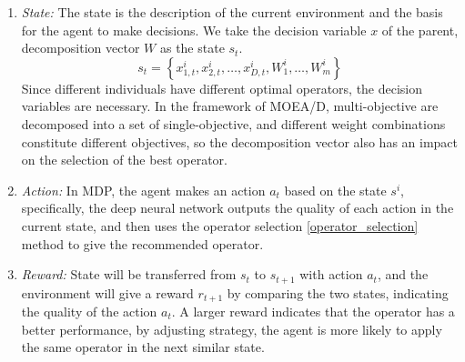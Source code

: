 \documentclass[journal]{IEEEtran}
\newcommand{\TODO}[1]{\textcolor[rgb]{1.00,0.40,0.22}{#1}}
\begin{document}
\begin{enumerate}
  \item \textit{State:}
        The state is the description of the current environment and the basis for the agent to make decisions. We take the decision variable $x$ of the parent, decomposition vector $W$ as the state $s_t$.
        \begin{equation}
          s_{t}=\left\{x_{1,t}^i, x_{2,t}^i, \ldots, x_{D,t}^i, W_{1}^{i}, \ldots, W_{m}^{i}\right\}
        \end{equation}
        Since different individuals have different optimal operators, the decision variables are necessary. In the framework of MOEA/D, multi-objective are decomposed into a set of single-objective, and different weight combinations constitute different objectives, so the decomposition vector also has an impact on the selection of the best operator.
  \item \textit{Action:}
        In MDP, the agent makes an action $a_t$ based on the state $s^i$, specifically, the deep neural network outputs the quality of each action in the current state, and then uses the operator selection \ref{operator_selection} method to give the recommended operator.
  \item \textit{Reward:}
        State will be transferred from $s_{t}$ to $s_{t+1}$ with action $a_t$, and the environment will give a reward $r_{t+1}$ by comparing the two states, indicating the quality of the action $a_t$. A larger reward indicates that the operator has a better performance, by adjusting strategy, the agent is more likely to apply the same operator in the next similar state.
\end{enumerate}
\end{document}
